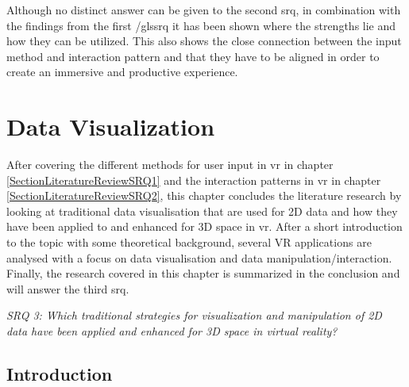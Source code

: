 Although no distinct answer can be given to the second \gls{srq}, in combination with the findings from the first /gls{srq} it has been shown where the strengths lie and how they can be utilized. This also shows the close connection between the input method and interaction pattern and that they have to be aligned in order to create an immersive and productive experience.



\section{Data Visualization}

\label{SectionLiteratureReviewSRQ3}

After covering the different methods for user input in \gls{vr} in chapter \ref{SectionLiteratureReviewSRQ1} and the interaction patterns in \gls{vr} in chapter \ref{SectionLiteratureReviewSRQ2}, this chapter concludes the literature research by looking at traditional data visualisation that are used for 2D data and how they have been applied to and enhanced for 3D space in \gls{vr}. After a short introduction to the topic with some theoretical background, several VR applications are analysed with a focus on data visualisation and data manipulation/interaction. Finally, the research covered in this chapter is summarized in the conclusion and will answer the third \gls{srq}.
\begin{framed}
	\textit{SRQ 3: Which traditional strategies for visualization and manipulation of 2D data have been applied and enhanced for 3D space in virtual reality?}
\end{framed}



\subsection{Introduction}

